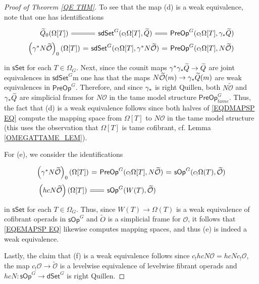 \documentclass[a4paper,10pt
,draft
]{article}%
\numberwithin{equation}{section}
\numberwithin{figure}{section}
\theoremstyle{definition} %
\newcommand{\sSet}{\ensuremath{\mathsf{sSet}}}%
\newcommand{\sOp}{\ensuremath{\mathsf{sOp}}}%
\newcommand{\dSet}{\mathsf{dSet}}
\renewcommand{\O}{\ensuremath{\mathcal O}}
\newcommand{\1}{\ensuremath{\mathbbm 1}}%
\begin{document}
\begin{proof}[Proof of Theorem \ref{QE THM}]
To see that the map (d) is a weak equivalence,
note that one has identifications 
\begin{equation}\label{EQDMAPSP EQ}
\begin{tikzcd}[row sep=0,column sep=7pt]
	\widetilde{Q}_0(\Omega[T])
	\ar[equal]{r}
&
	\mathsf{sdSet}^G(c_!\Omega[T],\widetilde{Q})
	\ar[equal]{r}
&
	\mathsf{PreOp}^G(c_!\Omega[T],\gamma_{\**}\widetilde{Q})
\\
	\left(\gamma^{\**} N \widetilde{\mathcal{O}}\right)_0(\Omega[T])
	\ar[equal]{r}
&
	\mathsf{sdSet}^G(c_!\Omega[T],\gamma^{\**} N \widetilde{\mathcal{O}})
	\ar[equal]{r}
&
	\mathsf{PreOp}^G(c_!\Omega[T], N \widetilde{\mathcal{O}})
\end{tikzcd}
\end{equation}
in $\sSet$ for each $T \in \Omega_G$.
Next, since the counit maps 
$\gamma^{\**} \gamma_{\**} \widetilde{Q} \to \widetilde{Q}$
are joint equivalences in 
$\mathsf{sdSet}^G$m
one has that the maps
$N\widetilde{\O}(m) \to \gamma_{\**}
\widetilde{Q}(m)$
are weak equivalences in $\mathsf{PreOp}^G$.
Therefore, and since $\gamma_{\**}$ is right Quillen,
both $N\widetilde{\O}$ and $\gamma_{\**}\widetilde{Q}$
are simplicial frames for $N \O$
in the tame model structure
$\mathsf{PreOp}^G_{tame}$.
Thus, the fact that (d) is a weak equivalence
follows since both halves of \eqref{EQDMAPSP EQ}
compute the mapping space from 
$\Omega[T]$ to $N \O$
in the tame model structure
(this uses the observation that
$\Omega[T]$ is tame cofibrant, cf. Lemma \ref{OMEGATTAME_LEM}).


For (e), we consider the identifications
\begin{equation}\label{EQEMAPSP EQ}
\begin{tikzcd}[row sep=0,column sep=7pt]
	\left(\gamma^{\**} N \widetilde{\mathcal{O}}\right)_0(\Omega[T])
	\ar[equal]{r}
&
	\mathsf{PreOp}^G(c_!\Omega[T], N \widetilde{\mathcal{O}})
	\ar[equal]{r}
&
	\mathsf{sOp}^G(c_!\Omega(T), \widetilde{\mathcal{O}})
\\
	\left(hcN \widetilde{\mathcal{O}} \right)(\Omega[T])
	\ar[equal]{r} 
&
	\mathsf{sOp}^G(W(T),  \widetilde{\mathcal{O}})
\end{tikzcd}
\end{equation}
in $\mathsf{sSet}$ for each $T \in \Omega_G$.
Thus, since $W(T) \to \Omega(T)$ is a weak equivalence of cofibrant operads in $\sOp^G$
and $\widetilde{O}$ is a simplicial frame for $\O$,
it follows that 
\eqref{EQEMAPSP EQ}
likewise computes mapping spaces, 
and thus (e) is indeed a weak equivalence. 

Lastly, the claim that (f)
is a weak equivalence follows since
$c_! hcN \mathcal{O} = hcN c_! \mathcal{O}$,
the map
$c_! \mathcal{O} \to \widetilde{\O}$
is a levelwise equivalence of levelwise fibrant operads
and $hcN: \sOp^G \to \dSet^G$ is right Quillen.
\end{proof}
\end{document}
